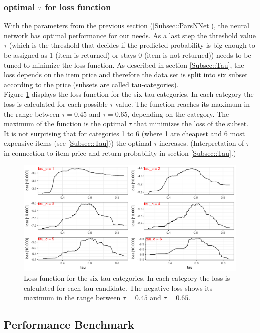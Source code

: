 \documentclass[a4paper,12pt]{article}
\begin{document}
\subsubsection{optimal $\tau$ for loss function}
With the parameters from the previous section (\ref{Subsec::ParsNNet}), the neural network has optimal performance for our needs. As a last step the threshold value $\tau$ (which is the threshold that decides if the predicted probability is big enough to be assigned as 1 (item is returned) or stays 0 (item is not returned)) needs to be tuned to minimize the loss function. As described in section \ref{Subsec::Tau}, the loss depends on the item price and therefore the data set is split into six subset according to the price (subsets are called tau-categories). \\
Figure \ref{Figure::FindTau} displays the loss function for the six tau-categories. In each category the loss is calculated for each possible $\tau$ value. The function reaches its maximum in the range between $\tau=0.45$ and $\tau = 0.65$, depending on the category. The maximum of the function is the optimal $\tau$ that minimizes the loss of the subset. It is not surprising that for categories 1 to 6 (where 1 are cheapest and 6 most expensive items (see \ref{Subsec::Tau})) the optimal $\tau$ increases. (Interpretation of $\tau$ in connection to item price and return probability in section \ref{Subsec::Tau}.)

\begin{figure}
 \includegraphics[width=\textwidth]{pictures/find_tau.png}
 \caption{Loss function for the six tau-categories. In each category the loss is calculated for each tau-candidate. The negative loss shows its maximum in the range between $\tau=0.45$ and $\tau = 0.65$.}
 \label{Figure::FindTau}
\end{figure}

\subsection{Performance Benchmark}
\end{document}
